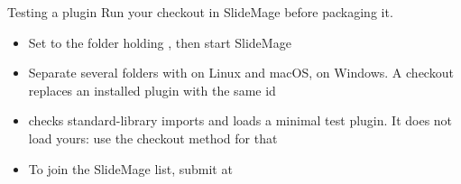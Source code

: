 
\begin{standardframe}{Testing a plugin}
	\small
	Run your checkout in SlideMage before packaging it.
	\par\medskip
	\begin{itemize}
		\item Set  to the folder holding , then start SlideMage
		\item Separate several folders with \SMCode{:} on Linux and macOS, \SMCode{;} on Windows. A checkout replaces an installed plugin with the same id
		\item {} checks standard-library imports and loads a minimal test plugin. It does not load yours: use the checkout method for that
		\item To join the SlideMage list, submit at \href{https://slidemage.org/plugins/submit/}{}
	\end{itemize}
\end{standardframe}
